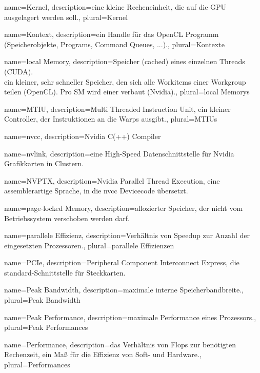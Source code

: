 {
	name=Kernel,
	description={eine kleine Recheneinheit, die auf die GPU ausgelagert werden soll.},
	plural=Kernel
}

{
	name=Kontext,
	description={ein Handle für das OpenCL Programm (Speicherobjekte, Programs, Command Queues, ...).},
	plural=Kontexte
}

{
	name=local Memory,
	description={Speicher (cached) eines einzelnen Threads (CUDA). \\ ein kleiner, sehr schneller Speicher, den sich alle Workitems einer Workgroup teilen (OpenCL). Pro SM wird einer verbaut (Nvidia).},
	plural=local Memorys
}

{
	name=MTIU,
	description={Multi Threaded Instruction Unit, ein kleiner Controller, der Instruktionen an die Warps ausgibt.},
	plural=MTIUs
}

{
	name=nvcc,
	description={Nvidia C(++) Compiler}
}

{
	name=nvlink,
	description={eine High-Speed Datenschnittstelle für Nvidia Grafikkarten in Clustern.}
}

{
	name=NVPTX,
	description={Nvidia Parallel Thread Execution, eine assemblerartige Sprache, in die nvcc Devicecode übersetzt.}
}

{
	name=page-locked Memory,
	description={allozierter Speicher, der nicht vom Betriebssystem verschoben werden darf.}
}

{
	name=parallele Effizienz,
	description={Verhältnis von Speedup zur Anzahl der eingesetzten Prozessoren.},
	plural=parallele Effizienzen
}

{
	name=PCIe,
	description={Peripheral Component Interconnect Express, die standard-Schnittstelle für Steckkarten.}
}

{
	name=Peak Bandwidth,
	description={maximale interne Speicherbandbreite.},
	plural=Peak Bandwidth
}

{
	name=Peak Performance,
	description={maximale Performance eines Prozessors.},
	plural=Peak Performances
}

{
	name=Performance,
	description={das Verhältnis von Flops zur benötigten Rechenzeit, ein Maß für die Effizienz von Soft- und Hardware.},
	plural=Performances
}

